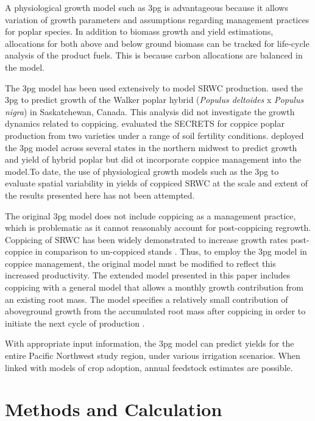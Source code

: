 \documentclass[preprint,12pt]{elsarticle}
\begin{document}
A physiological growth model such as \ac{3pg} is advantageous because
it allows variation of growth parameters and assumptions regarding
management practices for poplar species.  In addition to biomass
growth and yield estimations, allocations for both above and below
ground biomass can be tracked for life-cycle analysis of the product
fuels.  This is because carbon allocations are balanced in the model.

The \ac{3pg} model has been used extensively to model \ac{SRWC}
production. \citet{Amichev2010} used the \ac{3pg} to predict growth of
the Walker poplar hybrid (\textit{Populus deltoides} x \textit{Populus
  nigra}) in Saskatchewan, Canada. This analysis did not investigate
the growth dynamics related to coppicing. \citet{Deckmyn2004}
evaluated the \ac{SECRETS} for coppice poplar production from two
varieties under a range of soil fertility conditions. \citet{Headlee2012} deployed the \ac{3pg} model across
several states in the northern midwest to predict growth and yield of
hybrid poplar but did ot incorporate coppice management into the model.To date, the use of
physiological growth models such as the \ac{3pg} to evaluate spatial
variability in yields of coppiced \ac{SRWC} at the scale and extent of
the results presented here has not been attempted. 


The original \ac{3pg} model does not include coppicing as a management
practice, which is problematic as it cannot reasonably account for
post-coppicing regrowth.  Coppicing of \ac{SRWC} has been widely
demonstrated to increase growth rates post-coppice in comparison to
un-coppiced stands
\cite{Verwijst1996,Afas2008a,Sennerby-Forsse1992}. Thus, to employ the
\ac{3pg} model in coppice management, the
original model must be modified to reflect this increased
productivity. The extended model presented in this paper includes coppicing with a
general model that allows a monthly growth contribution from an
existing root mass.  The model specifies a relatively small
contribution of aboveground growth from the accumulated root mass
after coppicing in order to initiate the next cycle of production \cite{Deckmyn2004}.


With appropriate input information, the \ac{3pg} model can predict
yields for the entire Pacific Northwest study region, under various
irrigation scenarios.  When linked with models of crop adoption,
annual feedstock estimates are possible.

\section{Methods and Calculation}
\end{document}
